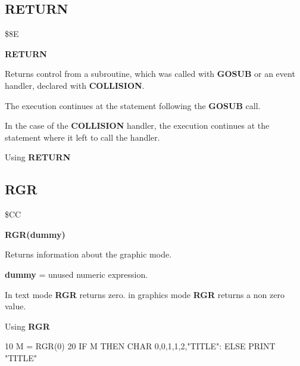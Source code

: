 \subsection{RETURN}
\begin{description}[leftmargin=3cm,style=nextline]
\item [Token:] \$8E
\item [Format:] {\bf RETURN}
\item [Usage:]  Returns control from a subroutine, which
                was called with {\bf GOSUB} or an event
                handler, declared with {\bf COLLISION}.

                The execution continues at the statement
                following the {\bf GOSUB} call.

                In the case of the {\bf COLLISION} handler,
                the execution continues at the statement
                where it left to call the handler.

\item [Example:] Using {\bf RETURN}

\end{description}


\newpage
\subsection{RGR}
\begin{description}[leftmargin=3cm,style=nextline]
\item [Token:] \$CC
\item [Format:] {\bf RGR(dummy)}
\item [Usage:]  Returns information about the graphic mode.

                {\bf dummy} = unused numeric expression.

                In text mode {\bf RGR} returns zero.
                in graphics mode {\bf RGR} returns a non zero value.

\item [Example:] Using {\bf RGR}

\begin{screenoutput}
 10 M = RGR(0)
 20 IF M THEN CHAR 0,0,1,1,2,"TITLE": ELSE PRINT "TITLE"
\end{screenoutput}
\end{description}

